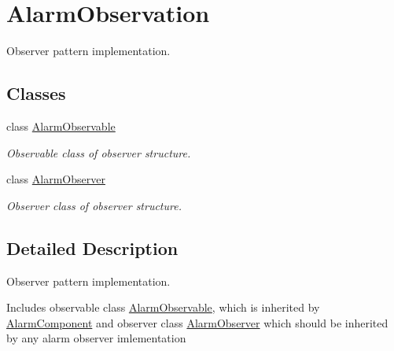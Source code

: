 \hypertarget{group__AlarmObservation}{}\section{Alarm\+Observation}
\label{group__AlarmObservation}


Observer pattern implementation.  


\subsection*{Classes}
\begin{DoxyCompactItemize}
\item 
class \hyperlink{classAlarmObservable}{Alarm\+Observable}
\begin{DoxyCompactList}\small\item\em Observable class of observer structure. \end{DoxyCompactList}\item 
class \hyperlink{classAlarmObserver}{Alarm\+Observer}
\begin{DoxyCompactList}\small\item\em Observer class of observer structure. \end{DoxyCompactList}\end{DoxyCompactItemize}


\subsection{Detailed Description}
Observer pattern implementation. 

Includes observable class \hyperlink{classAlarmObservable}{Alarm\+Observable}, which is inherited by \hyperlink{classAlarmComponent}{Alarm\+Component} and observer class \hyperlink{classAlarmObserver}{Alarm\+Observer} which should be inherited by any alarm observer imlementation 